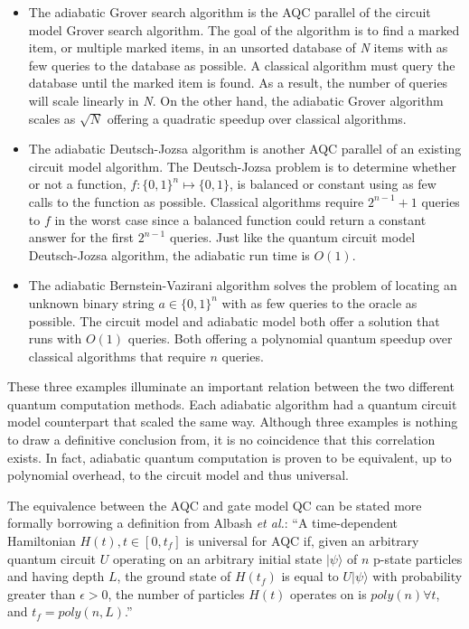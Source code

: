 \documentclass[%
 reprint,
 amsmath,amssymb,
 aps,
]{revtex4-1}
\begin{document}
   \begin{itemize}
   	\item The adiabatic Grover search algorithm is the AQC parallel of the circuit model Grover search algorithm. The goal of the algorithm is to find a marked item, or multiple marked items, in an unsorted database of \textit{N} items with as few queries to the database as possible. A classical algorithm must query the database until the marked item is found. As a result, the number of queries will scale linearly in \textit{N}. On the other hand, the adiabatic Grover algorithm scales as $\sqrt{N}$ offering a quadratic speedup over classical algorithms.
   \item The adiabatic Deutsch-Jozsa algorithm is another AQC parallel of an existing circuit model algorithm. The Deutsch-Jozsa problem is to determine whether or not a function, $f: \lbrace0,1\rbrace^n \longmapsto \lbrace0,1\rbrace$, is balanced or constant using as few calls to the function as possible. Classical algorithms require $2^{n-1} + 1$ queries to $f$ in the worst case since a balanced function could return a constant answer for the first $2^{n-1}$ queries. Just like the quantum circuit model Deutsch-Jozsa algorithm, the adiabatic run time is $O(1)$.
   \item The adiabatic Bernstein-Vazirani algorithm solves the problem of locating an unknown binary string $ a \in \lbrace0,1\rbrace^n  $ with as few queries to the oracle as possible. The circuit model and adiabatic model both offer a solution that runs with $O(1)$ queries. Both offering a polynomial quantum speedup over classical algorithms that require $n$ queries.
   \end{itemize}
   
   These three examples illuminate an important relation between the two different quantum computation methods. Each adiabatic algorithm had a quantum circuit model counterpart that scaled the same way. Although three examples is nothing to draw a definitive conclusion from, it is no coincidence that this correlation exists. In fact, adiabatic quantum computation is proven to be equivalent, up to polynomial overhead, to the circuit model and thus universal\cite{Aharanov2007}. 
   
   The equivalence between the AQC and gate model QC can be stated more formally borrowing a definition from Albash \textit{et al.}: ``A time-dependent Hamiltonian $H(t), t\in [0,t_{f}]$ is universal for AQC if, given an arbitrary quantum circuit $U$ operating on an arbitrary initial state $\vert\psi\rangle$ of $n$ p-state particles and having depth $L$, the ground state of $H(t_f)$ is equal to $U\vert\psi\rangle$ with probability greater than $\epsilon>0$, the number of particles $H(t)$ operates on is $poly(n) \forall t$, and $t_f = poly(n,L)$.\cite{RevModPhys.90.015002}''
\end{document}
